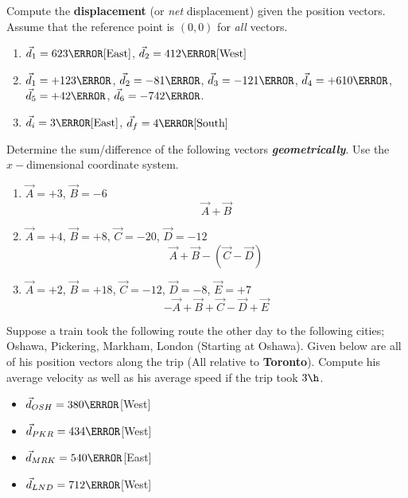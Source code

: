 \documentclass[12pt]{article} %
\newcommand{\tx}[1]{\text{#1}}
\begin{document}
\begin{qstn}[3]
	Compute the \textbf{displacement} (or \emph{net} displacement) given the position vectors. Assume that the reference point is $(0,0)$ for \emph{all} vectors.
    \begin{enumerate}[label=(\alph*)]
        \item $\vec d_1 = 623 \tx{\m}[\tx{East}]$, $\vec d_2 = 412 \tx{\m}[\tx{West}]$
         \vspace*{4cm}
        \item $\vec d_1 = +123\km$, $\vec d_2 = -81\km$, $\vec d_3 = -121\km$, $\vec d_4 = +610\km$, $\vec d_5 = +42\km$, $\vec d_6 = -742\m$.
        \vspace*{4cm}
        \item $\vec d_i = 3\tx{\m}[\tx{East}]$, $\vec d_f = 4\tx{\m}[\tx{South}]$
		\vspace*{5cm}
    \end{enumerate}

\end{qstn}


\begin{qstn}[4]
	Determine the sum/difference of the following vectors \textbf{\emph{geometrically}}. Use the $x-$dimensional coordinate system.
	\begin{enumerate}[label=(\alph*)]
		\item $\vec A = +3$, $\vec B = -6$ $$\vec A + \vec B$$
		\vspace*{7cm}
		\item $\vec A = +4$, $\vec B = +8$, $\vec C = -20$, $\vec D = -12$   $$\vec A + \vec B - (\vec C - \vec D)$$
		\newpage
		\item $\vec A = +2$, $\vec B = +18$, $\vec C = -12$, $\vec D = -8$, $\vec E = +7$  $$-\vec A  + \vec B + \vec C - \vec D + \vec E$$
		\vspace*{7cm}
	\end{enumerate}

\end{qstn}


\begin{qstn}[5]
	Suppose a train took the following route the other day to the following cities; Oshawa, Pickering, Markham, London (Starting at Oshawa). Given below are all of his position vectors along the trip (All relative to \textbf{Toronto}). Compute his average velocity as well as his average speed if the trip took $3 \h$.
	\begin{itemize}
	\item $\vec d_{OSH} = 380\km$[West]
	\item $\vec d_{PKR} = 434\km$[West]
	\item $\vec d_{MRK} = 540\km$[East]
	\item $\vec d_{LND} = 712\km$[West]
	\end{itemize}
	

\end{qstn}
\end{document}
